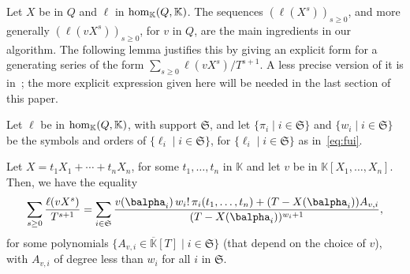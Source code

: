 \documentclass[12pt]{article}
\newcommand{\lf}{X}
\def\K{\mathbb{K}}
\def\K {\ensuremath{\mathbb{K}}}
\def\Kbar {{\ensuremath{\overline{\mathbb{K}}}}}
\begin{document}
Let $\lf$ be in $Q$ and $\ell$ in ${\rm hom}_\K(Q,\K)$.  The sequences
$(\ell(\lf^s))_{s\ge 0}$, and more generally $(\ell(v \lf^s))_{s\ge
  0}$, for $v$ in $Q$, are the main ingredients in our algorithm.  The
following lemma justifies this by giving an explicit form for a
generating series of the form $\sum_{s \ge 0} \ell(v
\lf^s)/T^{s+1}$. A less precise version of it is in~\cite{BoSaSc03};
the more explicit expression given here will be needed in the last
section of this paper.

\begin{lemma}\label{lemma:formula}
  Let $\ell$ be in ${\rm hom}_\K(Q,\K)$, with support $\mathfrak{S}$,
  and let $\{\pi_i \mid i \in \mathfrak{S}\}$ and $\{w_i \mid i \in
  \mathfrak{S}\}$ be the symbols and orders of $\{\ell_i \mid i \in \mathfrak{S}\}$,
  for $\{\ell_i \mid i \in \mathfrak{S}\}$ as in~\eqref{eq:fui}.
	
  Let $\lf=t_1 X_1 + \cdots +t_n X_n$, for some $t_1,\dots,t_n$ in $\K$
  and let $v$ be in $\K[X_1,\dots,X_n]$. Then, we have the equality
  \begin{align}\label{eq:sumgenseries}
    \sum_{s \ge 0} \frac{\ell(v \lf^s)}{T^{s+1}} = \sum_{i \in \mathfrak{S}}
    \frac{ v(\balpha_i)\, w_i!\, \pi_{i}(t_1,\dots,t_n) +
      (T-\lf(\balpha_i))A_{v,i}} {(T-\lf(\balpha_i))^{w_{i}+1}},
  \end{align}
  for some polynomials $\{A_{v,i} \in \Kbar[T] \mid i \in \mathfrak{S}\}$ (that
  depend on the choice of $v$), with $A_{v,i}$ of degree less than $w_i$ for all $i$ in
  $\mathfrak{S}$.
\end{lemma}
\end{document}

